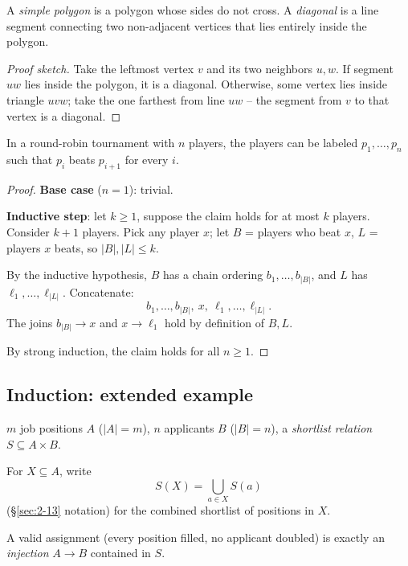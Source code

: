 \documentclass[11pt]{article}
\begin{document}
\bigskip
\begin{definition}
A \emph{simple polygon} is a polygon whose sides do not cross. A \emph{diagonal} is a line segment connecting two non-adjacent vertices that lies entirely inside the polygon.
\end{definition}

\begin{lemma}
\end{lemma}
\begin{proof}[Proof sketch]
Take the leftmost vertex $v$ and its two neighbors $u,w$. If segment $uw$ lies inside the polygon, it is a diagonal. Otherwise, some vertex lies inside triangle $uvw$; take the one farthest from line $uw$ -- the segment from $v$ to that vertex is a diagonal.
\end{proof}


\bigskip
\begin{theorem}
In a round-robin tournament with $n$ players, the players can be labeled $p_1,\dots,p_n$ such that $p_i$ beats $p_{i+1}$ for every $i$.
\end{theorem}
\begin{proof}
\textbf{Base case} ($n=1$): trivial.

\textbf{Inductive step}: let $k\ge1$, suppose the claim holds for at most $k$ players. Consider $k+1$ players. Pick any player $x$; let $B$ = players who beat $x$, $L$ = players $x$ beats, so $|B|,|L|\le k$.

By the inductive hypothesis, $B$ has a chain ordering $b_1,\dots,b_{|B|}$, and $L$ has $\ell_1,\dots,\ell_{|L|}$. Concatenate:
\[
b_1,\dots,b_{|B|},\ x,\ \ell_1,\dots,\ell_{|L|}.
\]
The joins $b_{|B|}\to x$ and $x\to\ell_1$ hold by definition of $B,L$.

By strong induction, the claim holds for all $n\ge1$.
\end{proof}
\subsection{Induction: extended example}
\label{sec:3-12}

\begin{note}[Setup]
$m$ job positions $A$ ($|A|=m$), $n$ applicants $B$ ($|B|=n$), a \emph{shortlist relation} $S \subseteq A\times B$.

For $X \subseteq A$, write
\[
S(X) = \bigcup_{a\in X} S(a)
\]
(\S\ref{sec:2-13} notation) for the combined shortlist of positions in $X$.

A valid assignment (every position filled, no applicant doubled) is exactly an \emph{injection} $A \to B$ contained in $S$.
\end{note}
\end{document}
